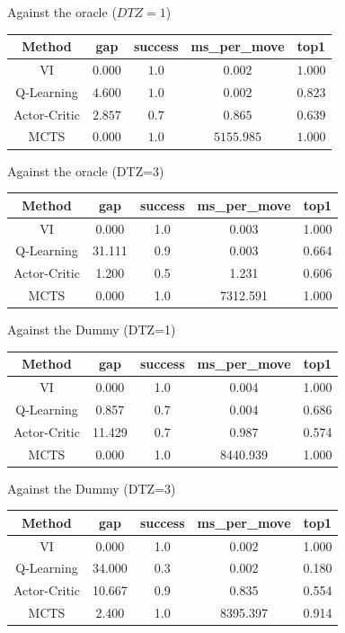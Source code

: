 \begin{frame}{Against the oracle ($DTZ=1$)}
    \centering
    \begin{tabular}{ccccc}
    \hline
    Method & gap & success & ms\_per\_move & top1  \\
    \hline
    VI             & $0.000$ & $1.0$ & $0.002$   & $1.000$  \\
    Q-Learning     & $4.600$ & $1.0$ & $0.002$   & $0.823$  \\
    Actor-Critic   & $2.857$ & $0.7$ & $0.865$   & $0.639$  \\
    MCTS           & $0.000$ & $1.0$ & $5155.985$ & $1.000$ \\
    \hline
    \end{tabular}
\end{frame}

\begin{frame}{Against the oracle (DTZ=3)}
    \centering
    \begin{tabular}{ccccc}
    \hline
    Method & gap & success & ms\_per\_move & top1 \\
    \hline
    VI            & 0.000 & 1.0 & 0.003   & 1.000 \\
    Q-Learning    & 31.111 & 0.9 & 0.003   & 0.664\\
    Actor-Critic  & 1.200 & 0.5 & 1.231   & 0.606  \\
    MCTS          & 0.000 & 1.0 & 7312.591 & 1.000 \\
    \hline
    \end{tabular}
\end{frame}

\begin{frame}{Against the Dummy (DTZ=1)}
    \centering
    \begin{tabular}{ccccc}
    \hline
    Method & gap & success & ms\_per\_move & top1 \\
    \hline
    VI            & 0.000 & 1.0 & 0.004   & 1.000 \\
    Q-Learning    & 0.857 & 0.7 & 0.004   & 0.686 \\
    Actor-Critic  & 11.429 & 0.7 & 0.987   & 0.574\\
    MCTS          & 0.000 & 1.0 & 8440.939 & 1.000 \\
    \hline
    \end{tabular}
\end{frame}

\begin{frame}{Against the Dummy (DTZ=3)}
    \centering
    \begin{tabular}{ccccc}
    \hline
    Method & gap & success & ms\_per\_move & top1 \\
    \hline
    VI            & 0.000 & 1.0 & 0.002   & 1.000 \\
    Q-Learning    & 34.000 & 0.3 & 0.002   & 0.180 \\
    Actor-Critic  & 10.667 & 0.9 & 0.835   & 0.554 \\
    MCTS          & 2.400  & 1.0 & 8395.397 & 0.914\\
    \hline
    \end{tabular}
\end{frame}


